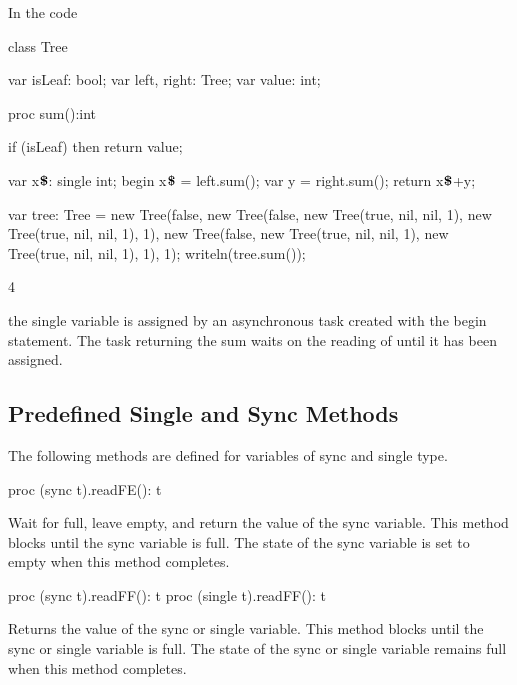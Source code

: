 \begin{example}
In the code
\begin{chapelpre}
\end{chapelpre}
\begin{chapel}
class Tree {
  var isLeaf: bool;
  var left, right: Tree;
  var value: int;

  proc sum():int {
    if (isLeaf) then 
       return value;

    var x$\mbox{{\bf \$}}$: single int;
    begin x$\mbox{{\bf \$}}$ = left.sum();
    var y = right.sum();
    return x$\mbox{{\bf \$}}$+y;
  }
}
\end{chapel}
\begin{chapelpost}
var tree: Tree = new Tree(false, new Tree(false, new Tree(true, nil, nil, 1),
                                                 new Tree(true, nil, nil, 1), 1),
                                 new Tree(false, new Tree(true, nil, nil, 1),
                                                 new Tree(true, nil, nil, 1), 1), 1);
writeln(tree.sum());
\end{chapelpost}
\begin{chapeloutput}
4
\end{chapeloutput}
the single variable  is assigned by an
asynchronous task created with the begin statement.  The task
returning the sum waits on the reading of 
until it has been assigned.
\end{example}

\subsection{Predefined Single and Sync Methods}
\label{Functions_on_Synchronization_Variables}

The following methods are defined for variables of sync and single
type.

\begin{protohead}
proc (sync t).readFE(): t
\end{protohead}
\begin{protobody}
Wait for full, leave empty, and return the value of the sync variable.
This method blocks until the sync variable is full.  The state of the
sync variable is set to empty when this method completes.
\end{protobody}

\begin{protohead}
proc (sync t).readFF(): t
proc (single t).readFF(): t
\end{protohead}
\begin{protobody}
Returns the value of the sync or single variable.  This method blocks
until the sync or single variable is full.  The state of the sync or
single variable remains full when this method completes.
\end{protobody}

